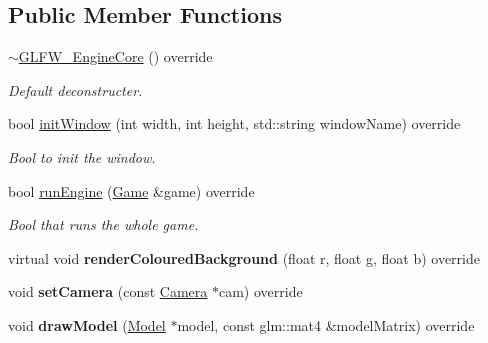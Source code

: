 \subsection*{Public Member Functions}
\begin{DoxyCompactItemize}
\item 
\mbox{\label{class_g_l_f_w___engine_core_adf17916892982f1103140b22dc1b37be}} 
\mbox{\hyperlink{class_g_l_f_w___engine_core_adf17916892982f1103140b22dc1b37be}{$\sim$\+G\+L\+F\+W\+\_\+\+Engine\+Core}} () override
\begin{DoxyCompactList}\small\item\em Default deconstructer. \end{DoxyCompactList}\item 
bool \mbox{\hyperlink{class_g_l_f_w___engine_core_aa786131ec64e7ee6779c3ac1ee8507ce}{init\+Window}} (int width, int height, std\+::string window\+Name) override
\begin{DoxyCompactList}\small\item\em Bool to init the window. \end{DoxyCompactList}\item 
bool \mbox{\hyperlink{class_g_l_f_w___engine_core_adf9266f1a9b5d97992691224f0f20c7b}{run\+Engine}} (\mbox{\hyperlink{class_game}{Game}} \&game) override
\begin{DoxyCompactList}\small\item\em Bool that runs the whole game. \end{DoxyCompactList}\item 
\mbox{\label{class_g_l_f_w___engine_core_a6031a54b0978d6e0fd1be3f292c2059f}} 
virtual void {\bfseries render\+Coloured\+Background} (float r, float g, float b) override
\item 
\mbox{\label{class_g_l_f_w___engine_core_a2aba4fb8a635f96fc4057ba841670a29}} 
void {\bfseries set\+Camera} (const \mbox{\hyperlink{class_camera}{Camera}} $\ast$cam) override
\item 
\mbox{\label{class_g_l_f_w___engine_core_abee5bb01d70b20b2b3b79e29940a7027}} 
void {\bfseries draw\+Model} (\mbox{\hyperlink{class_model}{Model}} $\ast$model, const glm\+::mat4 \&model\+Matrix) override
\end{DoxyCompactItemize}



